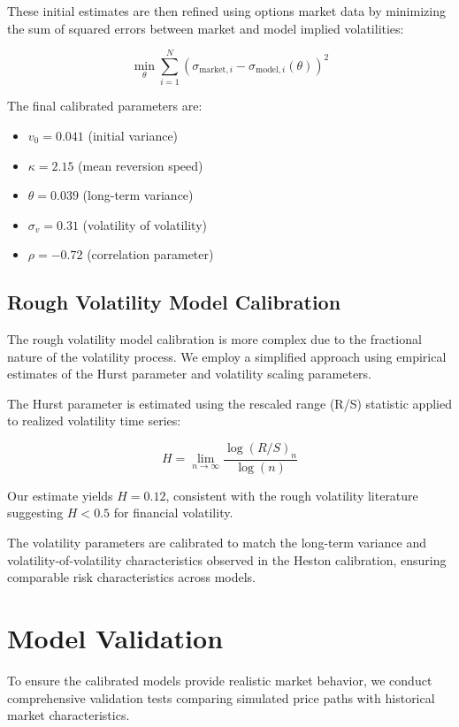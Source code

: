 \documentclass[12pt,a4paper]{report}
\begin{document}
These initial estimates are then refined using options market data by minimizing the sum of squared errors between market and model implied volatilities:

\begin{equation}
\min_{\theta} \sum_{i=1}^N \left(\sigma_{\text{market},i} - \sigma_{\text{model},i}(\theta)\right)^2
\end{equation}

The final calibrated parameters are:
\begin{itemize}
\item $v_0 = 0.041$ (initial variance)
\item $\kappa = 2.15$ (mean reversion speed)  
\item $\theta = 0.039$ (long-term variance)
\item $\sigma_v = 0.31$ (volatility of volatility)
\item $\rho = -0.72$ (correlation parameter)
\end{itemize}

\subsection{Rough Volatility Model Calibration}

The rough volatility model calibration is more complex due to the fractional nature of the volatility process. We employ a simplified approach using empirical estimates of the Hurst parameter and volatility scaling parameters.

The Hurst parameter is estimated using the rescaled range (R/S) statistic applied to realized volatility time series:

\begin{equation}
H = \lim_{n \to \infty} \frac{\log(R/S)_n}{\log(n)}
\end{equation}

Our estimate yields $H = 0.12$, consistent with the rough volatility literature suggesting $H < 0.5$ for financial volatility.

The volatility parameters are calibrated to match the long-term variance and volatility-of-volatility characteristics observed in the Heston calibration, ensuring comparable risk characteristics across models.

\section{Model Validation}

To ensure the calibrated models provide realistic market behavior, we conduct comprehensive validation tests comparing simulated price paths with historical market characteristics.
\end{document}
